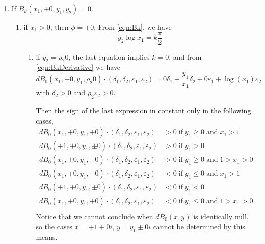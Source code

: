 \documentclass {article}
\renewcommand {\epsilon}{\varepsilon}
\renewcommand {\leq}{\leqslant}
\renewcommand {\geq}{\geqslant}
\begin{document}
\begin {enumerate}
\begin {enumerate}
  \item if $y_2\neq 0$, then from \ref {eqn:Bk}
    \[
    x_2 = \exp\left(\frac{k-y_1}{2y_2}\pi\right)
    \]
    But the number in the right hand side of the last equation is
    known to be transcendental unless $k-y_1=0$.
    As $x_2$ is dyadic, we have $y_1= k$ and $x_2=+1$.
    Using \ref {eqn:BkDerivative}, we write
    \[
    dB_k(\sigma_1 0, +1, k, y_2)\cdot(\delta_1, \delta_2, \epsilon_1,
    \epsilon_2) = - k \delta_1 + y_2 \delta_2 + \frac{\pi}{2} \epsilon_1 + 0
    \epsilon_2
    \]
    where $\sigma_1 \delta_1 > 0$.

    Here, $\delta_2$ can take negative and positive values preventing the sign
    of $dB_k(\sigma_1 0, +1, k, y_2)\cdot (\delta_1, \delta_2, \epsilon_1,
    \epsilon_2)$ from being constant.
  \end {enumerate}

\item If $B_k(x_1, +0, y_1, y_2)=0$.
  \begin {enumerate}
  \item if $x_1 >0$, then $\phi = +0$.
    From \ref {eqn:Bk}, we have
    \[
    y_2 \log x_1 = k \frac{\pi}{2}
    \]
    \begin {enumerate}
    \item if $y_2 = \rho_2 0$, the last equation implies $k = 0$, and from
      \ref {eqn:BkDerivative} we have
      \[
      dB_0(x_1, +0, y_1, \rho_2 0)\cdot(\delta_1, \delta_2, \epsilon_1,
      \epsilon_2) = 0 \delta_1 + \frac{y_1}{x_1} \delta_2 + 0 \epsilon_1 +
      \log(x_1) \epsilon_2
      \]
      with $\delta_2 > 0$ and $\rho_2 \epsilon_2 > 0$.

      Then the sign of the last expression in constant only in the following
      cases,
      \begin {align*}
        dB_0(x_1, +0, y_1, +0)\cdot(\delta_1, \delta_2, \epsilon_1,
        \epsilon_2) &> 0 \;\text{if}\; y_1 \geq 0 \;\text{and}\; x_1 > 1\\
        dB_0(+1, +0, y_1, \pm 0)\cdot(\delta_1, \delta_2, \epsilon_1,
        \epsilon_2) &> 0 \;\text{if}\; y_1 > 0\\
        dB_0(x_1, +0, y_1, -0)\cdot(\delta_1, \delta_2, \epsilon_1,
        \epsilon_2) &> 0 \;\text{if}\; y_1 \geq 0 \;\text{and}\; 1 > x_1 > 0 \\
        dB_0(x_1, +0, y_1, -0)\cdot(\delta_1, \delta_2, \epsilon_1,
        \epsilon_2) &< 0 \;\text{if}\; y_1 \leq 0 \;\text{and}\; x_1 > 1\\
        dB_0(+1, +0, y_1, \pm 0)\cdot(\delta_1, \delta_2, \epsilon_1,
        \epsilon_2) &< 0 \;\text{if}\; y_1 < 0\\
        dB_0(x_1, +0, y_1, +0)\cdot(\delta_1, \delta_2, \epsilon_1,
        \epsilon_2) &< 0 \;\text{if}\; y_1 \leq 0 \;\text{and}\; 1 > x_1 > 0\\
      \end {align*}
      Notice that we cannot conclude when $dB_0(x,y)$ is identically null,
      so the cases $x=+1+0i$, $y=y_1 \pm0i$ cannot be determined by this
      means.


\end{enumerate}
\end{enumerate}
\end{enumerate}
\end{document}
